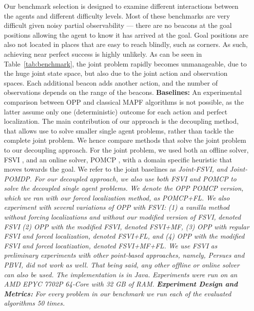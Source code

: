 \documentclass[letterpaper]{article} %
\newcommand{\guy}[1]{\textcolor{blue}{[Guy: #1]}}
\begin{document}
Our benchmark selection is designed to examine different interactions between the agents and different difficulty levels.
Most of these benchmarks are very difficult given noisy partial observability --- there are no beacons at the goal positions allowing the agent to know it has arrived at the goal. Goal positions are also not located in places that are easy to reach blindly, such as corners. As such, achieving near perfect success is highly unlikely.
As can be seen in Table~\ref{tab:benchmark}, the joint problem rapidly becomes unmanageable, due to the huge joint state space, but also due to the joint action and observation spaces. Each additional beacon adds another action, and the number of observations depends on the range of the beacons.
\noindent\textbf{Baselines:} An experimental comparison between OPP and classical MAPF algorithms is not possible, as the latter assume only one (deterministic) outcome for each action and perfect localization.
The main contribution of our approach is the decoupling method, that allows use to solve smaller single agent problems, rather than tackle the complete joint problem. We hence compare methods that solve the joint problem to our decoupling approach. For the joint problem, we used both an offline solver, FSVI \cite{shani2013survey}, and an online solver, POMCP \cite{silver2010monte}, with a domain specific heuristic that moves towards the goal. We refer to the joint baselines as \em{Joint-FSVI}, and \em{Joint-POMDP}. %
For our decoupled approach, we also use both FSVI and POMCP to solve the decoupled single agent problems. We denote the OPP POMCP version, which we ran with our forced localization method, as \emph{POMCP+FL}.
We also experiment with several variations of OPP with FSVI: (1) a vanilla method without forcing localizations and without our modified version of FSVI, denoted \emph{FSVI} (2) OPP with the modified FSVI, denoted \emph{FSVI+MF},  (3) OPP with regular FSVI and forced localization, denoted \emph{FSVI+FL}, and (4) OPP with the modified FSVI and forced locatization, denoted \emph{FSVI+MF+FL}.
We use FSVI as preliminary experiments with other point-based approaches, namely, Persues and PBVI, did not work as well. That being said, any other offline or online solver can also be used.
The implementation is in Java. Experiments were run on an AMD\textsc{\textregistered} EPYC 7702P 64-Core with 32 GB of RAM.
\noindent\textbf{Experiment Design and Metrics:}
For every problem in our benchmark we run each of the evaluated algorithms 50 times.
\end{document}
